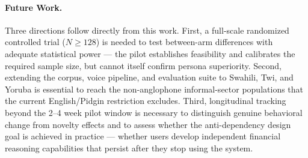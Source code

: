 \paragraph{Future Work.} Three directions follow directly from this work. First, a full-scale randomized controlled trial ($N \ge 128$) is needed to test between-arm differences with adequate statistical power --- the pilot establishes feasibility and calibrates the required sample size, but cannot itself confirm persona superiority. Second, extending the corpus, voice pipeline, and evaluation suite to Swahili, Twi, and Yoruba is essential to reach the non-anglophone informal-sector populations that the current English/Pidgin restriction excludes. Third, longitudinal tracking beyond the 2--4 week pilot window is necessary to distinguish genuine behavioral change from novelty effects and to assess whether the anti-dependency design goal is achieved in practice --- whether users develop independent financial reasoning capabilities that persist after they stop using the system.
